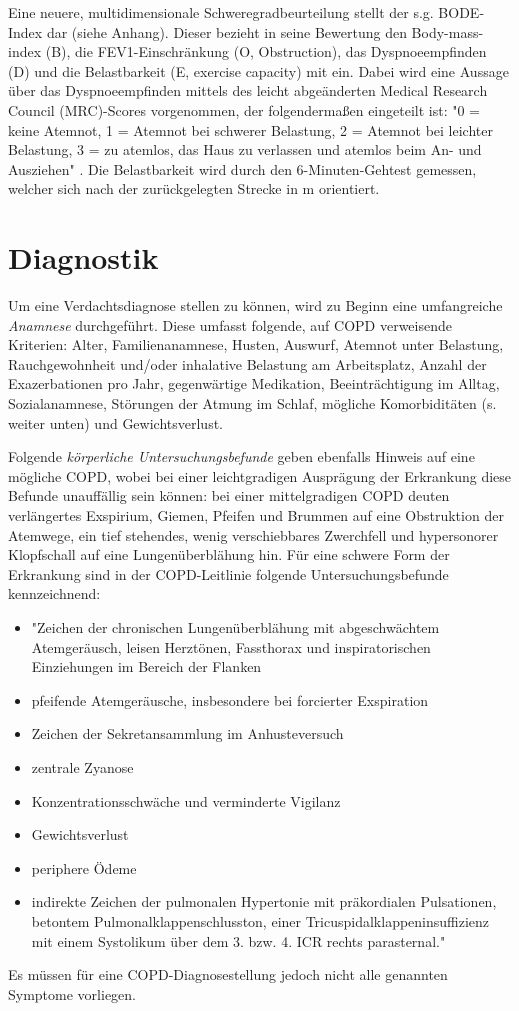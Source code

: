 Eine neuere, multidimensionale Schweregradbeurteilung stellt der s.g. BODE-Index dar (siehe Anhang). Dieser bezieht in seine Bewertung den Body-mass-index (B), die FEV1-Einschränkung (O, Obstruction), das Dyspnoeempfinden (D) und die Belastbarkeit (E, exercise capacity) mit ein. Dabei wird eine Aussage über das Dyspnoeempfinden mittels des leicht abgeänderten Medical Research Council (MRC)-Scores vorgenommen, der folgendermaßen eingeteilt ist: "0 = keine Atemnot, 1 = Atemnot bei schwerer Belastung, 2 = Atemnot bei leichter Belastung, 3 = zu atemlos, das Haus zu verlassen und atemlos beim An- und Ausziehen" \autocite[186f.]{welte2007}. Die Belastbarkeit wird durch den 6-Minuten-Gehtest gemessen, welcher sich nach der zurückgelegten Strecke in m orientiert.


\section{Diagnostik} %
\label{diagnostik}
Um eine Verdachtsdiagnose stellen zu können, wird zu Beginn eine umfangreiche \emph{Anamnese} durchgeführt. Diese umfasst folgende, auf COPD verweisende Kriterien: Alter, Familienanamnese, Husten, Auswurf, Atemnot unter Belastung, Rauchgewohnheit und/oder inhalative Belastung am Arbeitsplatz, Anzahl der Exazerbationen pro Jahr, gegenwärtige Medikation, Beeinträchtigung im Alltag, Sozialanamnese, Störungen der Atmung im Schlaf, mögliche Komorbiditäten (s. weiter unten) und Gewichtsverlust. 

Folgende \emph{körperliche Untersuchungsbefunde} geben ebenfalls Hinweis auf eine mögliche COPD, wobei bei einer leichtgradigen Ausprägung der Erkrankung diese Befunde unauffällig sein können: bei einer mittelgradigen COPD deuten verlängertes Exspirium, Giemen, Pfeifen und Brummen auf eine Obstruktion der Atemwege, ein tief stehendes, wenig verschiebbares Zwerchfell und hypersonorer Klopfschall auf eine Lungenüberblähung hin. Für eine schwere Form der Erkrankung sind in der COPD-Leitlinie folgende Untersuchungsbefunde kennzeichnend:
\begin{itemize}
\item "Zeichen der chronischen Lungenüberblähung mit abgeschwächtem Atemgeräusch, leisen Herztönen, Fassthorax und inspiratorischen Einziehungen im Bereich der Flanken
\item pfeifende Atemgeräusche, insbesondere bei forcierter Exspiration
\item Zeichen der Sekretansammlung im Anhusteversuch
\item zentrale Zyanose
\item Konzentrationsschwäche und verminderte Vigilanz
\item Gewichtsverlust
\item periphere Ödeme
\item indirekte Zeichen der pulmonalen Hypertonie mit präkordialen Pulsationen, betontem Pulmonalklappenschlusston, einer Tricuspidalklappeninsuffizienz mit einem Systolikum über
dem 3. bzw. 4. ICR rechts parasternal." \autocite[e6]{vogelmeier2007}
\end{itemize}
Es müssen für eine COPD-Diagnosestellung jedoch nicht alle genannten Symptome vorliegen.

